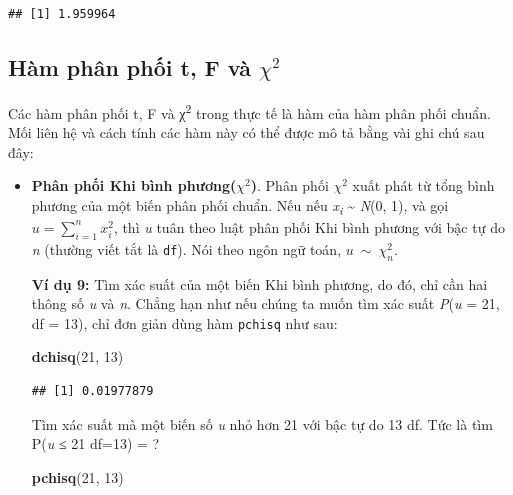 \documentclass[
]{book}
\newenvironment{Shaded}{\begin{snugshade}}{\end{snugshade}}
\newcommand{\DecValTok}[1]{\textcolor[rgb]{0.00,0.00,0.81}{#1}}
\newcommand{\KeywordTok}[1]{\textcolor[rgb]{0.13,0.29,0.53}{\textbf{#1}}}
\newcommand{\NormalTok}[1]{#1}
\begin{document}
\begin{verbatim}
## [1] 1.959964
\end{verbatim}

\hypertarget{huxe0m-phuxe2n-phux1ed1i-t-f-vuxe0-chi2}{%
\subsection{\texorpdfstring{Hàm phân phối t, F và \(\chi^{2}\)}{Hàm phân phối t, F và \textbackslash chi\^{}\{2\}}}\label{huxe0m-phuxe2n-phux1ed1i-t-f-vuxe0-chi2}}

Các hàm phân phối t, F và χ\textsuperscript{2} trong thực tế là hàm của hàm phân phối chuẩn. Mối liên hệ và cách tính các hàm này có thể được mô tả bằng vài ghi chú sau đây:

\begin{itemize}
\item
  \textbf{Phân phối Khi bình phương(}\(\chi^{2}\)\textbf{)}. Phân phối \(\chi^{2}\) xuất phát từ tổng bình phương của một biến phân phối chuẩn. Nếu nếu \emph{x\textsubscript{i}} \textasciitilde{} \emph{N}(0, 1), và gọi \(u = \sum_{i = 1}^{n}x_{i}^{2}\), thì \emph{u} tuân theo luật phân phối Khi bình phương với bậc tự do \emph{n} (thường viết tắt là \texttt{df}). Nói theo ngôn ngữ toán, \(u\ \sim\ \chi_{n}^{2}\).

  \textbf{Ví dụ 9:} Tìm xác suất của một biến Khi bình phương, do đó, chỉ cần hai thông số \emph{u} và \emph{n}. Chẳng hạn như nếu chúng ta muốn tìm xác suất \emph{P}(\emph{u} = 21, df = 13), chỉ đơn giản dùng hàm \texttt{pchisq} như sau:

\begin{Shaded}
\begin{Highlighting}[]
\KeywordTok{dchisq}\NormalTok{(}\DecValTok{21}\NormalTok{, }\DecValTok{13}\NormalTok{)}
\end{Highlighting}
\end{Shaded}

\begin{verbatim}
## [1] 0.01977879
\end{verbatim}

  Tìm xác suất mà một biến số \emph{u} nhỏ hơn 21 với bậc tự do 13 df. Tức là tìm P(\emph{u} ≤ 21 \textbar{} df=13) = ?

\begin{Shaded}
\begin{Highlighting}[]
\KeywordTok{pchisq}\NormalTok{(}\DecValTok{21}\NormalTok{, }\DecValTok{13}\NormalTok{)}
\end{Highlighting}
\end{Shaded}


\end{itemize}
\end{document}
